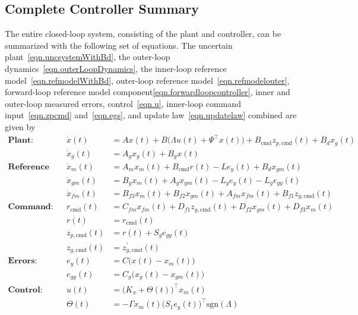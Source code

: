 \subsection{Complete Controller Summary}

The entire closed-loop system, consisting of the plant and controller, can be summarized with the following set of equations.
The uncertain plant\ \eqref{eqn.uncsystemWithBd}, the outer-loop dynamics\ \eqref{eqn.outerLoopDynamics}, the inner-loop reference model\ \eqref{eqn.refmodelWithBd}, outer-loop reference model\ \eqref{eqn.refmodelouter}, forward-loop reference model component\eqref{eqn.forwardloopcontroller}, inner and outer-loop measured errors, control\ \eqref{eqn.u}, inner-loop command input\ \eqref{eqn.zpcmd} and\ \eqref{eqn.egs}, and update law\ \eqref{eqn.updatelaw} combined are given by
\begin{equation*}
  \begin{aligned}
    \textbf{Plant:}
    && \dot{x}(t) &= Ax(t) + B\bigr(\Lambda u(t)+\Psi^{\top}x(t)\bigr) + B_{\text{cmd}}z_{p,\text{cmd}}(t) + B_{d}x_{g}(t) \\
    && \dot{x}_{g}(t) &= A_{g}x_{g}(t) + B_{g}x(t) \\
    \textbf{Reference model:}
    && \dot{x}_{m}(t) &= A_{m}x_{m}(t) + B_{\text{cmd}}r(t) - Le_{y}(t) + B_{d}x_{gm}(t) \\
    && \dot{x}_{gm}(t) &= B_{g}x_{m}(t) + A_{g}x_{gm}(t) - L_{y}e_{y}(t) - L_{g}e_{gy}(t) \\
    && \dot{x}_{fm}(t) &= B_{f3}x_{m}(t) + B_{f2}x_{gm}(t) + A_{fm}x_{fm}(t) + B_{f1}z_{g,\text{cmd}}(t) \\
    \textbf{Command:}
    && r_{\text{cmd}}(t) &= C_{fm}x_{fm}(t) + D_{f1}z_{g,\text{cmd}}(t) + D_{f2}x_{gm}(t) + D_{f3} x_{m}(t) \\
    && r(t) &= r_{\text{cmd}}(t) \\
    && z_{p,\text{cmd}}(t) &= r(t) + S_{g}e_{gy}(t) \\
    && z_{g,\text{cmd}}(t) &= z_{g,\text{cmd}}^{\prime}(t) \\
    \textbf{Errors:}
    && e_{y}(t) &= C\bigr(x(t)-x_{m}(t)\bigr) \\
    && e_{gy}(t) &= C_{g}\bigr(x_{g}(t) - x_{gm}(t)\bigr) \\
    \textbf{Control:}
    && u(t) &= \bigr(K_{x}+\Theta(t)\bigr)^{\top}x_{m}(t) \\
    && \dot{\Theta}(t) &= -\Gamma x_{m}(t)\bigr(S_{1}e_{y}(t)\bigr)^{\top}\text{sgn}(\Lambda) \\
  \end{aligned}
\end{equation*}

